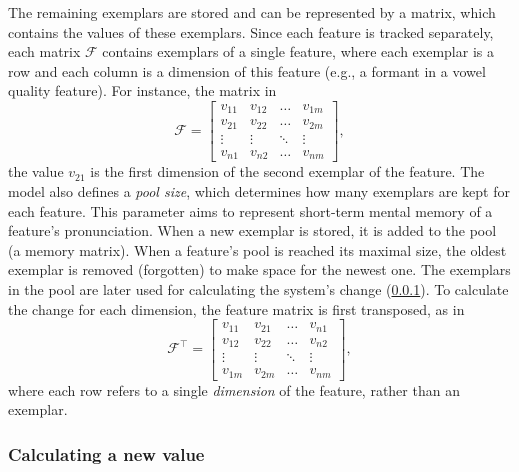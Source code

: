 The remaining exemplars are stored and can be represented by a matrix, which contains the values of these exemplars.
Since each feature is tracked separately, each matrix $\mathcal{F}$ contains exemplars of a single feature, where each exemplar is a row and each column is a dimension of this feature (e.g., a formant in a vowel quality feature).
For instance, the matrix in
%
\begin{equation}
	\label{eq:feature_matrix}
	\mathcal{F} =
	\begin{bmatrix} 
		v_{11} & v_{12} & \dots  & v_{1m}\\
		v_{21} & v_{22} & \dots  & v_{2m}\\
		\vdots & \vdots & \ddots & \vdots\\
		v_{n1} & v_{n2} & \dots  & v_{nm} 
	\end{bmatrix},
\end{equation}
\noindent
%
the value $v_{21}$ is the first dimension of the second exemplar of the feature.
The model also defines a \textit{pool size}, which determines how many exemplars are kept for each feature.
This parameter aims to represent short-term mental memory of a feature's pronunciation.
When a new exemplar is stored, it is added to the pool (a memory matrix).
When a feature's pool is reached its maximal size, the oldest exemplar is removed (forgotten) to make space for the newest one.
The exemplars in the pool are later used for calculating the system's change (\cref{subsubsec:calculating_changed_value}).
To calculate the change for each dimension, the feature matrix is first transposed, as in
%
\begin{equation}
	\label{eq:transposed_feature_matrix}
	\textbf{$\mathcal{F}$}^\top =
	\begin{bmatrix} 
		v_{11} & v_{21} & \dots  & v_{n1}\\
		v_{12} & v_{22} & \dots  & v_{n2} \\
		\vdots & \vdots & \ddots & \vdots \\
		v_{1m} & v_{2m} & \dots  & v_{nm} 
	\end{bmatrix},
\end{equation}
\noindent
%
where each row refers to a single \emph{dimension} of the feature, rather than an exemplar.

\subsubsection{Calculating a new value}
\label{subsubsec:calculating_changed_value}

